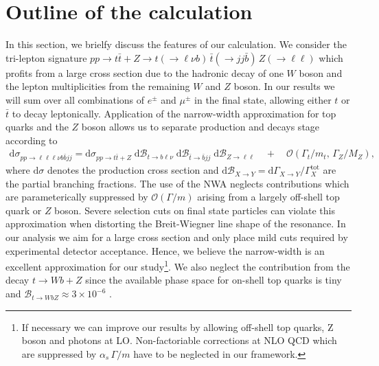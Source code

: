 \documentclass[preprint]{JHEP3} %
\newcommand{\mrm}{\mathrm}
\newcommand{\rd}{\mathrm{d}}
\newcommand{\Br}{\mathcal{B}}
\def\ttb{t\bar{t}}
\newcommand{\be}{\begin{eqnarray}}
\newcommand{\ee}{\end{eqnarray}}
\begin{document}
\section{Outline of the calculation}
In this section, we brielfy discuss the features of our calculation.
We consider the tri-lepton signature  
$pp \to \ttb + Z \to t(\to \ell \nu b) \, \bar{t} (\to jj \bar{b}) \, Z(\to \ell \ell)$
which profits from a large cross section due to the hadronic decay of one $W$ boson and the lepton multiplicities from the remaining $W$ and $Z$ boson.
In our results we will sum over all combinations of $e^\pm$ and $\mu^\pm$ in the final state, allowing either $t$ or $\bar t$ to decay leptonically.
Application of the narrow-width approximation for top quarks and the $Z$ boson allows us to separate production and decays stage according to 
\be
 \rd \sigma_{pp\to\ell\ell\ell\nu b \bar{b} jj} = \rd \sigma_{pp\to\ttb+Z} \; \rd\Br_{t\to b \ell\nu} \; \rd\Br_{\bar{t} \to \bar{b} jj} \; \rd\Br_{Z\to \ell\ell}
 \quad+\quad \mathcal{O}(\Gamma_t/m_t, \, \Gamma_Z/M_Z)
, \label{Xsec}
\ee
where $\rd \sigma$ denotes the production cross section and $\rd\Br_{X\to Y}= \rd \Gamma_{X\to Y} \big/ \Gamma^\mrm{tot}_X$ are the partial branching fractions.
The use of the NWA neglects contributions which are parameterically suppressed by $\mathcal{O}(\Gamma / m)$ arising from a largely off-shell top quark or $Z$ boson.
Severe selection cuts on final state particles can violate this approximation when distorting the Breit-Wiegner line shape of the resonance.
In our analysis we aim for a large cross section and only place mild cuts required by experimental detector acceptance. 
Hence, we believe the narrow-width is an excellent approximation for our study\footnote{
If necessary we can improve our results by allowing off-shell top quarks, Z boson and photons at LO.
Non-factoriable corrections at NLO QCD which are suppressed by $\alpha_s \, \Gamma/m$ have to be neglected in our framework.
}.
We also neglect the contribution from the decay $t \to Wb+Z$ since the available phase space for on-shell top quarks is tiny and $\Br_{t\to W bZ } \approx 3 \times 10^{-6}$ \cite{see Baur}.
\end{document}
